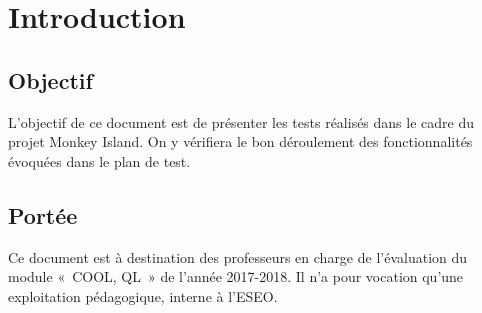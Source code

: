 %

\section{Introduction}
\label{sec:introduction}

\subsection{Objectif}
\label{subsec:introduction:objectif}

L'objectif de ce document est de présenter les tests réalisés dans le cadre du projet Monkey Island. On y vérifiera le bon déroulement des fonctionnalités évoquées dans le plan de test.

\subsection{Portée}
\label{subsec:introduction:portee}

Ce document est à destination des professeurs en charge de l'évaluation du module «~COOL, QL~» de l'année 2017-2018. Il n'a pour vocation qu'une exploitation pédagogique, interne à l'ESEO.


